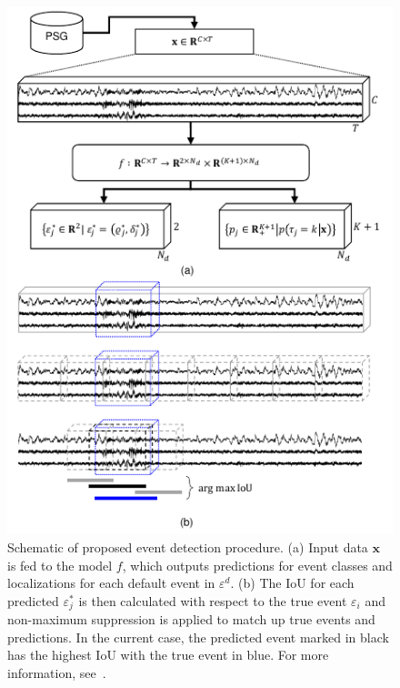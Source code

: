\begin{figure}
    \centering
    \includegraphics[width=\columnwidth]{figures/paper-iv/embc19-psg_event_detection-fig1-ppt.pdf}
    \caption[MSEDv1 schematic of event detection procedure]{Schematic of proposed event detection procedure. (a) Input data $\mathbf{x}$ is fed to the model $f$, which outputs predictions for event classes and localizations for each default event in $\varepsilon^{d}$. (b) The IoU for each predicted $\varepsilon^{*}_{j}$ is then calculated with respect to the true event $\varepsilon_{i}$ and non-maximum suppression is applied to match up true events and predictions. In the current case, the predicted event marked in black has the highest IoU with the true event in blue. For more information, see~\cite{Chambon2018b,Liu2016b}.}
    \label{fig:paperiv-schematic}
\end{figure}

